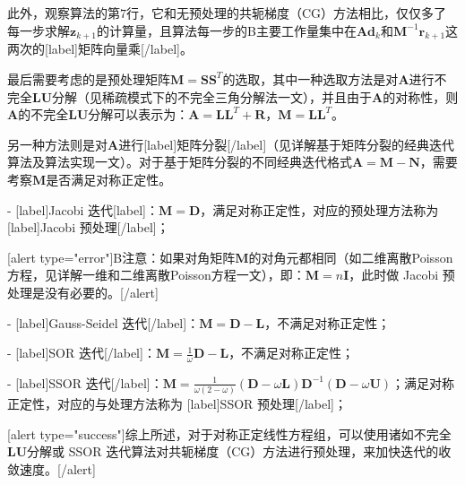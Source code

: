 \documentclass[12pt, UTF8, nofonts]{ctexart}
\begin{document}
此外，观察算法的第$7$行，它和无预处理的共轭梯度（CG）方法相比，仅仅多了每一步求解$\boldsymbol{z}_{k+1}$的计算量，且算法每一步的B主要工作量集中在$\boldsymbol{Ad}_k$和$\boldsymbol{M}^{-1}\boldsymbol{r}_{k+1}$这两次的[label]矩阵向量乘[/label]。

最后需要考虑的是预处理矩阵$\boldsymbol{M}=\boldsymbol{SS}^T$的选取，其中一种选取方法是对$\boldsymbol{A}$进行不完全$\boldsymbol{LU}$分解（见稀疏模式下的不完全三角分解法一文），并且由于$\boldsymbol{A}$的对称性，则$\boldsymbol{A}$的不完全$\boldsymbol{LU}$分解可以表示为：$\boldsymbol{A}=\boldsymbol{LL}^T+\boldsymbol{R}$，$\boldsymbol{M}=\boldsymbol{LL}^T$。

另一种方法则是对$\boldsymbol{A}$进行[label]矩阵分裂[/label]（见详解基于矩阵分裂的经典迭代算法及算法实现一文）。对于基于矩阵分裂的不同经典迭代格式$\boldsymbol{A}=\boldsymbol{M}-\boldsymbol{N}$，需要考察$\boldsymbol{M}$是否满足对称正定性。

- [label]Jacobi 迭代[label]：$\boldsymbol{M}=\boldsymbol{D}$，满足对称正定性，对应的预处理方法称为 [label]Jacobi 预处理[/label]；

[alert type="error"]B注意：如果对角矩阵$\boldsymbol{M}$的对角元都相同（如二维离散Poisson方程，见详解一维和二维离散Poisson方程一文），即：$\boldsymbol{M}=n\boldsymbol{I}$，此时做 Jacobi 预处理是没有必要的。[/alert]

- [label]Gauss-Seidel 迭代[/label]：$\boldsymbol{M}=\boldsymbol{D}-\boldsymbol{L}$，不满足对称正定性；

- [label]SOR 迭代[/label]：$\boldsymbol{M}=\frac{1}{\omega}\boldsymbol{D}-\boldsymbol{L}$，不满足对称正定性；

- [label]SSOR 迭代[/label]：$\boldsymbol{M} = \frac{1}{\omega(2-\omega)} (\boldsymbol{D}-\omega\boldsymbol{L})\boldsymbol{D}^{-1}(\boldsymbol{D}-\omega\boldsymbol{U})$；满足对称正定性，对应的与处理方法称为 [label]SSOR 预处理[/label]；

[alert type="success"]综上所述，对于对称正定线性方程组，可以使用诸如不完全$\boldsymbol{LU}$分解或 SSOR 迭代算法对共轭梯度（CG）方法进行预处理，来加快迭代的收敛速度。[/alert]

\end{document}
